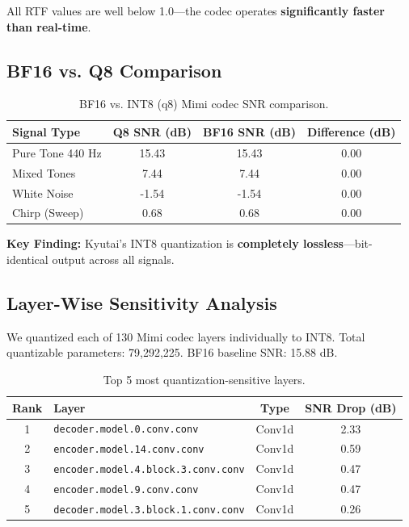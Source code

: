 \documentclass[11pt]{article}
\begin{document}
All RTF values are well below 1.0---the codec operates \textbf{significantly faster than real-time}.

\subsection{BF16 vs. Q8 Comparison}
\begin{table}[H]
\centering
\caption{BF16 vs. INT8 (q8) Mimi codec SNR comparison.}
\label{tab:bf16_vs_q8}
\begin{tabular}{@{}lccc@{}}
\toprule
\textbf{Signal Type} & \textbf{Q8 SNR (dB)} & \textbf{BF16 SNR (dB)} & \textbf{Difference (dB)} \\
\midrule
Pure Tone 440 Hz & 15.43 & 15.43 & 0.00 \\
Mixed Tones & 7.44 & 7.44 & 0.00 \\
White Noise & -1.54 & -1.54 & 0.00 \\
Chirp (Sweep) & 0.68 & 0.68 & 0.00 \\
\bottomrule
\end{tabular}
\end{table}

\textbf{Key Finding:} Kyutai's INT8 quantization is \textbf{completely lossless}---bit-identical output across all signals.

\subsection{Layer-Wise Sensitivity Analysis}
We quantized each of 130 Mimi codec layers individually to INT8. Total quantizable parameters: 79,292,225. BF16 baseline SNR: 15.88 dB.

\begin{table}[H]
\centering
\caption{Top 5 most quantization-sensitive layers.}
\label{tab:sensitive_layers}
\begin{tabular}{@{}clcc@{}}
\toprule
\textbf{Rank} & \textbf{Layer} & \textbf{Type} & \textbf{SNR Drop (dB)} \\
\midrule
1 & \texttt{decoder.model.0.conv.conv} & Conv1d & 2.33 \\
2 & \texttt{encoder.model.14.conv.conv} & Conv1d & 0.59 \\
3 & \texttt{encoder.model.4.block.3.conv.conv} & Conv1d & 0.47 \\
4 & \texttt{encoder.model.9.conv.conv} & Conv1d & 0.47 \\
5 & \texttt{decoder.model.3.block.1.conv.conv} & Conv1d & 0.26 \\
\bottomrule
\end{tabular}
\end{table}
\end{document}
